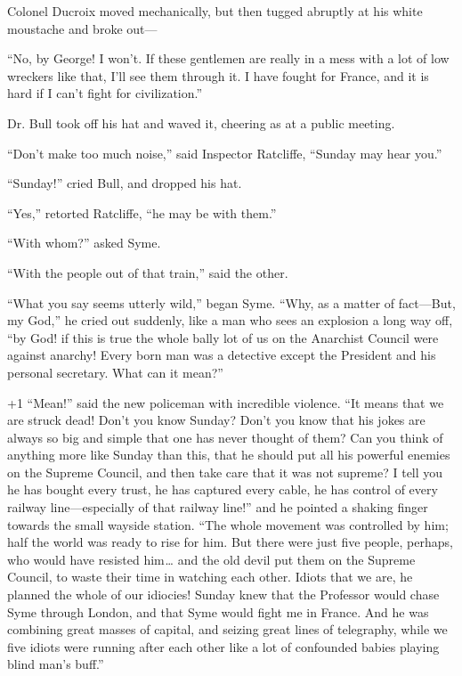 Colonel Ducroix moved mechanically, but then tugged abruptly at his white moustache and broke out⁠—

“No, by George! I won’t. If these gentlemen are really in a mess with a lot of low wreckers like that, I’ll see them through it. I have fought for France, and it is hard if I can’t fight for civilization.”

Dr. Bull took off his hat and waved it, cheering as at a public meeting.

“Don’t make too much noise,” said Inspector Ratcliffe, “Sunday may hear you.”

“Sunday!” cried Bull, and dropped his hat.

“Yes,” retorted Ratcliffe, “he may be with them.”

“With whom?” asked Syme.

“With the people out of that train,” said the other.

“What you say seems utterly wild,” began Syme. “Why, as a matter of fact⁠—But, my God,” he cried out suddenly, like a man who sees an explosion a long way off, “by God! if this is true the whole bally lot of us on the Anarchist Council were against anarchy! Every born man was a detective except the President and his personal secretary. What can it mean?”

\looseness+1
“Mean!” said the new policeman with incredible violence. “It means that we are struck dead! Don’t you know Sunday? Don’t you know that his jokes are always so big and simple that one has never thought of them? Can you think of anything more like Sunday than this, that he should put all his powerful enemies on the Supreme Council, and then take care that it was not supreme? I tell you he has bought every trust, he has captured every cable, he has control of every railway line⁠—especially of that railway line!” and he pointed a shaking finger towards the small wayside station. “The whole movement was controlled by him; half the world was ready to rise for him. But there were just five people, perhaps, who would have resisted him⁠ ⁠… and the old devil put them on the Supreme Council, to waste their time in watching each other. Idiots that we are, he planned the whole of our idiocies! Sunday knew that the Professor would chase Syme through London, and that Syme would fight me in France. And he was combining great masses of capital, and seizing great lines of telegraphy, while we five idiots were running after each other like a lot of confounded babies playing blind man’s buff.”

